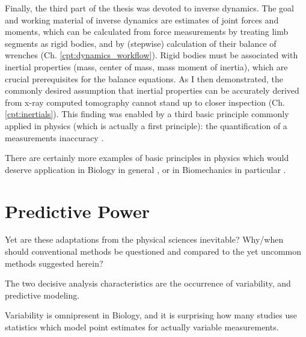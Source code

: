 Finally, the third part of the thesis was devoted to inverse dynamics.
The goal and working material of inverse dynamics are estimates of joint forces and moments, which can be calculated from force measurements by treating limb segments as rigid bodies, and by (stepwise) calculation of their balance of wrenches (Ch. \ref{cpt:dynamics_workflow}).
Rigid bodies must be associated with inertial properties (mass, center of mass, mass moment of inertia), which are crucial prerequisites for the balance equations.
As I then demonstrated, the commonly desired assumption that inertial properties can be accurately derived from x-ray computed tomography cannot stand up to closer inspection (Ch. \ref{cpt:inertials}).
This finding was enabled by a third basic principle commonly applied in physics (which is actually a first principle): the quantification of a measurements inaccuracy \citep{Hughes2010}.


There are certainly more examples of basic principles in physics which would deserve application in Biology in general \citep[e.g.][]{Busemeyer2015,Aerts1995}, or in Biomechanics in particular \citep{Dumas2004}.


\section{Predictive Power}
\label{sec:org074c382}
Yet are these adaptations from the physical sciences inevitable?
Why/when should conventional methods be questioned and compared to the yet uncommon methods suggested herein?


The two decisive analysis characteristics are the occurrence of variability, and predictive modeling.

Variability is omnipresent in Biology, and it is surprising how many studies use statistics which model point estimates for actually variable measurements.

